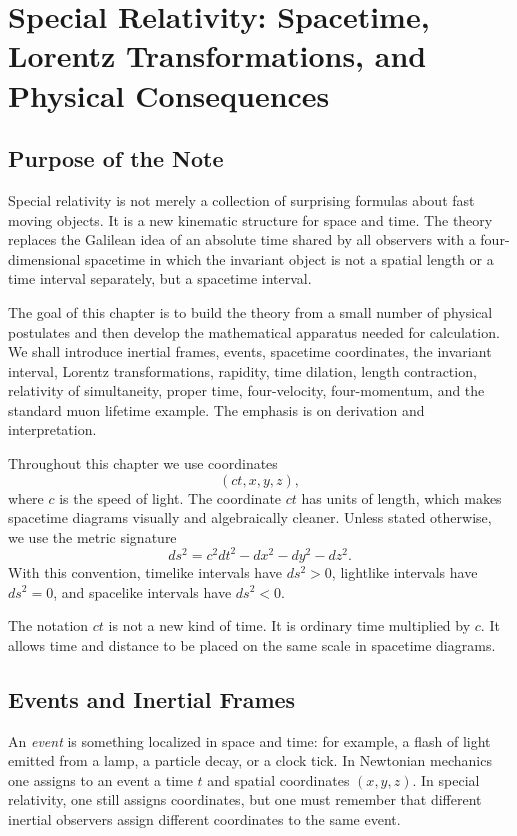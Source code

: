 \chapter{Special Relativity: Spacetime, Lorentz Transformations, and Physical Consequences}

\section{Purpose of the Note}

Special relativity is not merely a collection of surprising formulas about fast
moving objects. It is a new kinematic structure for space and time. The theory
replaces the Galilean idea of an absolute time shared by all observers with a
four-dimensional spacetime in which the invariant object is not a spatial length
or a time interval separately, but a spacetime interval.

The goal of this chapter is to build the theory from a small number of physical
postulates and then develop the mathematical apparatus needed for calculation.
We shall introduce inertial frames, events, spacetime coordinates, the invariant
interval, Lorentz transformations, rapidity, time dilation, length contraction,
relativity of simultaneity, proper time, four-velocity, four-momentum, and the
standard muon lifetime example. The emphasis is on derivation and interpretation.

Throughout this chapter we use coordinates
\[
(ct,x,y,z),
\]
where \(c\) is the speed of light. The coordinate \(ct\) has units of length,
which makes spacetime diagrams visually and algebraically cleaner. Unless stated
otherwise, we use the metric signature
\[
ds^2=c^2dt^2-dx^2-dy^2-dz^2.
\]
With this convention, timelike intervals have \(ds^2>0\), lightlike intervals
have \(ds^2=0\), and spacelike intervals have \(ds^2<0\).

\begin{remarkbox}
The notation \(ct\) is not a new kind of time. It is ordinary time multiplied by
\(c\). It allows time and distance to be placed on the same scale in spacetime
diagrams.
\end{remarkbox}

\clearpage

\section{Events and Inertial Frames}

An \emph{event} is something localized in space and time: for example, a flash
of light emitted from a lamp, a particle decay, or a clock tick. In Newtonian
mechanics one assigns to an event a time \(t\) and spatial coordinates
\((x,y,z)\). In special relativity, one still assigns coordinates, but one must
remember that different inertial observers assign different coordinates to the
same event.


